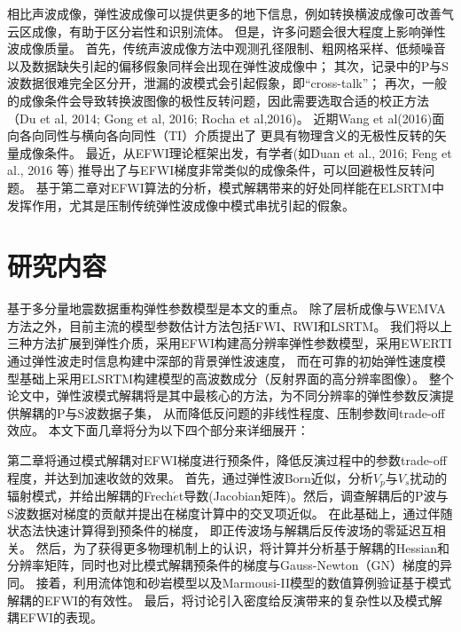 相比声波成像，弹性波成像可以提供更多的地下信息，例如转换横波成像可改善气云区成像，有助于区分岩性和识别流体。
但是，许多问题会很大程度上影响弹性波成像质量。
首先，传统声波成像方法中观测孔径限制、粗网格采样、低频噪音以及数据缺失引起的偏移假象同样会出现在弹性波成像中；
其次，记录中的P与S波数据很难完全区分开，泄漏的波模式会引起假象，即“cross-talk”；
再次，一般的成像条件会导致转换波图像的极性反转问题，因此需要选取合适的校正方法（Du et al,
2014\cite{DuEtAl2014}; Gong et al, 2016\cite{GongEtAl2016}; Rocha et al,2016\cite{RochaEtAl2016a})。
近期Wang et al(2016)\cite{WangChenlongEtAl2016}面向各向同性与横向各向同性（TI）介质提出了
更具有物理含义的无极性反转的矢量成像条件。
最近，从EFWI理论框架出发，有学者(如Duan et al., 2016\cite{Duan2016}; Feng et al., 2016\cite{Feng2016} 等)
推导出了与EFWI梯度非常类似的成像条件，可以回避极性反转问题。
基于第二章对EFWI算法的分析，模式解耦带来的好处同样能在ELSRTM中发挥作用，尤其是压制传统弹性波成像中模式串扰引起的假象。


\section{研究内容}
基于多分量地震数据重构弹性参数模型是本文的重点。
除了层析成像与WEMVA方法之外，目前主流的模型参数估计方法包括FWI、RWI和LSRTM。
我们将以上三种方法扩展到弹性介质，采用EFWI构建高分辨率弹性参数模型，采用EWERTI通过弹性波走时信息构建中深部的背景弹性波速度，
而在可靠的初始弹性速度模型基础上采用ELSRTM构建模型的高波数成分（反射界面的高分辨率图像）。
整个论文中，弹性波模式解耦将是其中最核心的方法，为不同分辨率的弹性参数反演提供解耦的P与S波数据子集，
从而降低反问题的非线性程度、压制参数间trade-off效应。
本文下面几章将分为以下四个部分来详细展开：

第二章将通过模式解耦对EFWI梯度进行预条件，降低反演过程中的参数trade-off程度，并达到加速收敛的效果。
首先，通过弹性波Born近似，分析$V_p$与$V_s$扰动的
辐射模式，并给出解耦的Frech{$\acute{e}$}t导数(Jacobian矩阵)。然后，调查解耦后的P波与S波数据对梯度的贡献并提出在梯度计算中的交叉项近似。
在此基础上，通过伴随状态法快速计算得到预条件的梯度，
即正传波场与解耦后反传波场的零延迟互相关。
然后，为了获得更多物理机制上的认识，将计算并分析基于解耦的Hessian和分辨率矩阵，同时也对比模式解耦预条件的梯度与Gauss-Newton（GN）梯度的异同。
接着，利用流体饱和砂岩模型以及Marmousi-II模型的数值算例验证基于模式解耦的EFWI的有效性。
最后，将讨论引入密度给反演带来的复杂性以及模式解耦EFWI的表现。

